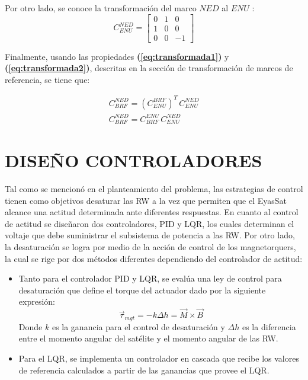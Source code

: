 Por otro lado, se conoce la transformación del marco $NED$ al $ENU$ :
$$
C_{ENU}^{NED}=\left[\begin{array}{ccc}
	0 &1 &0 \\
	1 & 0 & 0 \\
	0 & 0 &-1
\end{array}\right]
$$

Finalmente, usando las propiedades \textbf{(\ref{eq:transformada1})} y \textbf{(\ref{eq:transformada2})}, descritas en la sección de transformación de marcos de referencia, se tiene que:

\begin{gather}
	C_{BRF}^{NED} = \left(C_{ENU}^{BRF}\right)^T\,C_{ENU}^{NED}\\[10pt]
	C_{BRF}^{NED} = C_{BRF}^{ENU}\,C_{ENU}^{NED}
\end{gather}
	



\newpage
\section{DISEÑO CONTROLADORES}

Tal como se mencionó en el planteamiento del problema, las estrategias de control tienen como objetivos desaturar las RW a la vez que permiten que el EyasSat alcance una actitud determinada ante diferentes respuestas. En cuanto al control de actitud se diseñaron dos controladores, PID y LQR, los cuales determinan el voltaje que  debe suministrar el subsistema de potencia a las RW. Por otro lado, la desaturación se logra por medio de la acción de control de los magnetorquers, la cual se rige por dos métodos diferentes dependiendo del controlador de actitud:

\begin{itemize}
	 \item Tanto para el controlador PID y LQR, se evalúa una ley de control para desaturación que define el torque del actuador dado por la siguiente expresión:
	 	\begin{equation}
	 		\vec{\tau}_{mgt} = -k\Delta h =\vec{M}\times\vec{B} 
	 	\end{equation} 
	 Donde $k$ es la ganancia para el control de desaturación y $\Delta h$ es la diferencia entre el momento angular del satélite y el momento angular de las RW.
	 
	 \item Para el LQR, se implementa un controlador en cascada que recibe los valores de referencia calculados a partir de las ganancias que provee el LQR.   
\end{itemize}



